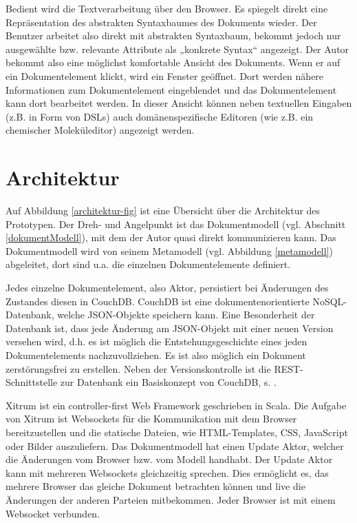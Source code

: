  
Bedient wird die Textverarbeitung über den Browser. Es spiegelt direkt eine Repräsentation des abstrakten Syntaxbaumes des Dokuments wieder. Der Benutzer arbeitet also direkt mit abstrakten Syntaxbaum, bekommt jedoch nur ausgewählte bzw. relevante Attribute als „konkrete Syntax“ angezeigt. Der Autor bekommt also eine möglichst komfortable Ansicht des Dokuments. Wenn er auf ein Dokumentelement klickt, wird ein Fenster geöffnet. Dort werden nähere Informationen zum Dokumentelement eingeblendet und das Dokumentelement kann dort bearbeitet werden. In dieser Ansicht können neben textuellen Eingaben (z.B. in Form von DSLs) auch domänenspezifische Editoren (wie z.B. ein chemischer Moleküleditor) angezeigt werden.

 
\section{Architektur}\label{}
 
Auf Abbildung \ref{architektur-fig} ist eine Übersicht über die Architektur des Prototypen. Der Dreh- und Angelpunkt ist das Dokumentmodell (vgl. Abschnitt \ref{dokumentModell}), mit dem der Autor quasi direkt kommunizieren kann. Das Dokumentmodell wird von seinem Metamodell (vgl. Abbildung \ref{metamodell}) abgeleitet, dort sind u.a. die einzelnen Dokumentelemente definiert.

 
Jedes einzelne Dokumentelement, also Aktor, persistiert bei Änderungen des Zustandes diesen in CouchDB. CouchDB ist eine dokumentenorientierte NoSQL-Datenbank, welche JSON-Objekte speichern kann. Eine Besonderheit der Datenbank ist, dass jede Änderung am JSON-Objekt mit einer neuen Version versehen wird, d.h. es ist möglich die Entstehungsgeschichte eines jeden Dokumentelements nachzuvollziehen. Es ist also möglich ein Dokument zerstörungsfrei zu erstellen. Neben der Versionskontrolle ist die REST-Schnittstelle zur Datenbank ein Basiskonzept von CouchDB, s. \citep{Anderson}.

 
Xitrum ist ein controller-first Web Framework geschrieben in Scala. Die Aufgabe von Xitrum ist Websockets für die Kommunikation mit dem Browser bereitzustellen und die statische Dateien, wie HTML-Templates, CSS, JavaScript oder Bilder auszuliefern. Das Dokumentmodell hat einen Update Aktor, welcher die Änderungen vom Browser bzw. vom Modell handhabt. Der Update Aktor kann mit mehreren Websockets gleichzeitig sprechen. Dies ermöglicht es, das mehrere Browser das gleiche Dokument betrachten können und live die Änderungen der anderen Parteien mitbekommen. Jeder Browser ist mit einem Websocket verbunden.

